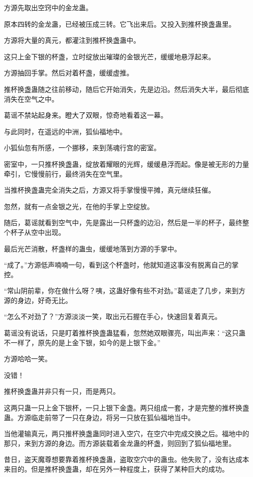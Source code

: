 \begin{this_body}
方源先取出空窍中的金龙蛊。

原本四转的金龙蛊，已经被压成三转。它飞出来后。又投入到推杯换盏蛊里。

方源将大量的真元，都灌注到推杯换盏蛊中。

这只上金下银的杯盏，立时绽放出璀璨的金银光芒，缓缓地悬浮起来。

方源抽回手掌。然后对着杯盏，缓缓虚推。

推杯换盏蛊随之往前移动，随后它开始消失，先是边沿。然后消失大半，最后彻底消失在空气之中。

葛谣不禁站起身来。瞪大了双眼，惊奇地看着这一幕。

与此同时，在遥远的中洲，狐仙福地中。

小狐仙忽有所感，一个挪移，来到荡魂行宫的密室。

密室中，一只推杯换盏蛊，绽放着耀眼的光辉，缓缓悬浮而起。像是被无形的力量牵引，它慢慢前行，最终消失在空气里。

当推杯换盏蛊完全消失之后，方源又将手掌慢慢平摊，真元继续狂催。

忽然，就有一点金银之光，在他的手掌上空绽放。

随后，葛谣就看到空气中，先是露出一只杯盏的边沿，然后是一半的杯子，最终整个杯子从空中出现。

最后光芒消散，杯盏样的蛊虫，缓缓地落到方源的手掌中。

“成了。”方源低声喃喃一句，看到这个杯盏时，他就知道这事没有脱离自己的掌控。

“常山阴前辈，你在做什么呀？咦，这蛊好像有些不对劲。”葛谣走了几步，来到方源的身边，好奇无比。

“怎么不对劲了？”方源淡淡一笑，取出元石握在手心，快速回复着真元。

葛谣没有说话，只是盯着推杯换盏蛊猛看，忽然她双眼骤亮，叫出声来：“这只蛊不一样了，原先的是上金下银，如今的是上银下金。”

方源哈哈一笑。

没错！

推杯换盏蛊并非只有一只，而是两只。

这两只蛊一只上金下银杯，一只上银下金盏。两只组成一套，才是完整的推杯换盏蛊。方源临走前带了一只在身边，将另一只放在狐仙福地当中。

当他灌输真元，两只推杯换盏蛊同时进入空穴，在空穴中完成交换之后。福地中的那只，来到方源的身边。而方源装载着金龙蛊的杯盏，则回到了狐仙福地里。

昔日，盗天魔尊想要靠着推杯换盏蛊，盗取空穴中的蛊虫。他失败了，没有达成本来目的。但是推杯换盏蛊，却在另外一种程度上，获得了某种巨大的成功。


\end{this_body}
